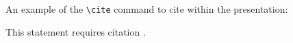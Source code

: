 An example of the \texttt{\textbackslash cite} command to cite within the presentation:

This statement requires citation \cite{Smith:2012qr}.

\clearpage

